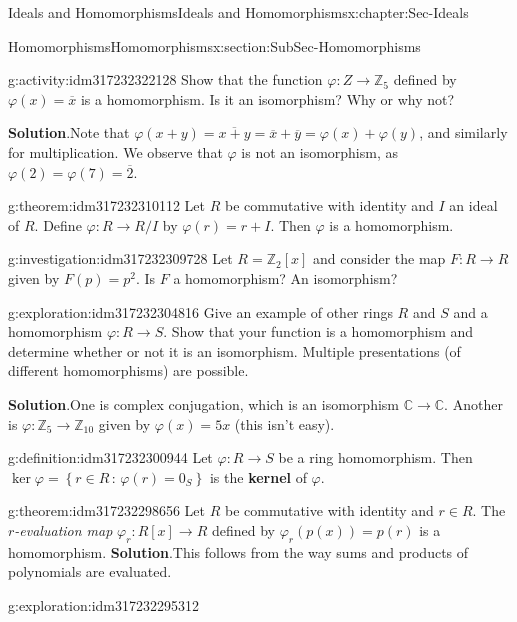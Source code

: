 \documentclass[oneside,10pt,]{book}
\newcommand{\blocktitlefont}{\relax}
\newcommand{\terminology}[1]{\textbf{#1}}
\numberwithin{equation}{section}
\def\p{\varphi}
\newcommand{\setof}[2]{{\left\{#1\,\colon\,#2\right\}}}
\def\C{{\mathbb C}}
\def\Z{{\mathbb Z}}
\begin{document}
\begin{chapterptx}{Ideals and Homomorphisms}{}{Ideals and Homomorphisms}{}{}{x:chapter:Sec-Ideals}
\begin{sectionptx}{Homomorphisms}{}{Homomorphisms}{}{}{x:section:SubSec-Homomorphisms}
\begin{activity}{}{g:activity:idm317232322128}%
Show that the function \(\p : Z\to \Z_{5}\) defined by \(\p(x) = \overline{x}\) is a homomorphism. Is it an isomorphism? Why or why not?%
\par\smallskip%
\noindent\textbf{\blocktitlefont Solution}.\hypertarget{g:solution:idm317232312048}{}\quad{}Note that \(\p(x+y) = \overline{x+y} = \overline{x} + \overline{y} = \p(x) + \p(y)\), and similarly for multiplication. We observe that \(\p\) is not an isomorphism, as \(\p(2) = \p(7) = \overline{2}\).%
\end{activity}
\begin{theorem}{}{}{g:theorem:idm317232310112}%
Let \(R\) be commutative with identity and \(I\) an ideal of \(R\). Define \(\p: R\to R/I\) by \(\p(r) = r+I\). Then \(\p\) is a homomorphism.%
\end{theorem}
\begin{investigation}{}{g:investigation:idm317232309728}%
Let \(R = \Z_2[x]\) and consider the map \(F: R \to R\) given by \(F(p) = p^2\). Is \(F\) a homomorphism? An isomorphism?%
\end{investigation}
\begin{exploration}{}{g:exploration:idm317232304816}%
Give an example of other rings \(R\) and \(S\) and a homomorphism \(\p : R\to S\). Show that your function is a homomorphism and determine whether or not it is an isomorphism. Multiple presentations (of different homomorphisms) are possible.%
\par\smallskip%
\noindent\textbf{\blocktitlefont Solution}.\hypertarget{g:solution:idm317232302720}{}\quad{}One is complex conjugation, which is an isomorphism \(\C\to\C\). Another is \(\p : \Z_5 \to \Z_{10}\) given by \(\p(x) = 5x\) (this isn't easy).%
\end{exploration}
\begin{definition}{}{g:definition:idm317232300944}%
Let \(\p : R \to S\) be a ring homomorphism. Then \(\ker \p =\setof{r\in R}{\p(r)=0_S}\) is the \terminology{kernel} of \(\p\).%
\end{definition}
\begin{theorem}{}{}{g:theorem:idm317232298656}%
Let \(R\) be commutative with identity and \(r\in R\). The \emph{\(r\)-evaluation map} \(\p_r : R[x] \to R\) defined by \(\p_r(p(x)) = p(r)\) is a homomorphism.%
\textbf{\blocktitlefont Solution}.\quad{}This follows from the way sums and products of polynomials are evaluated.%
\end{theorem}
\begin{exploration}{}{g:exploration:idm317232295312}%

\end{exploration}
\end{sectionptx}
\end{chapterptx}
\end{document}
